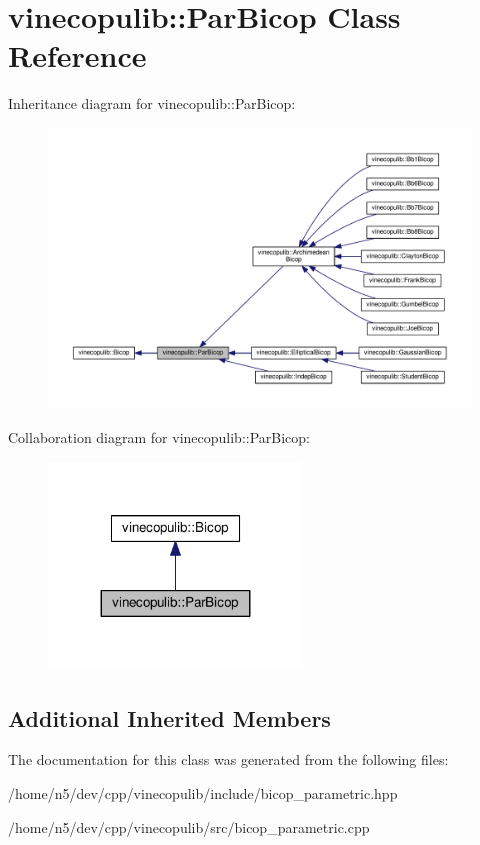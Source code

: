 \hypertarget{classvinecopulib_1_1_par_bicop}{}\section{vinecopulib\+:\+:Par\+Bicop Class Reference}
\label{classvinecopulib_1_1_par_bicop}


Inheritance diagram for vinecopulib\+:\+:Par\+Bicop\+:\nopagebreak
\begin{figure}[H]
\begin{center}
\leavevmode
\includegraphics[width=350pt]{classvinecopulib_1_1_par_bicop__inherit__graph}
\end{center}
\end{figure}


Collaboration diagram for vinecopulib\+:\+:Par\+Bicop\+:\nopagebreak
\begin{figure}[H]
\begin{center}
\leavevmode
\includegraphics[width=191pt]{classvinecopulib_1_1_par_bicop__coll__graph}
\end{center}
\end{figure}
\subsection*{Additional Inherited Members}


The documentation for this class was generated from the following files\+:\begin{DoxyCompactItemize}
\item 
/home/n5/dev/cpp/vinecopulib/include/bicop\+\_\+parametric.\+hpp\item 
/home/n5/dev/cpp/vinecopulib/src/bicop\+\_\+parametric.\+cpp\end{DoxyCompactItemize}
